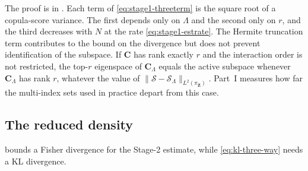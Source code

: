 \documentclass[review,hidelinks,onefignum,onetabnum]{siamart251216}
\newcommand{\mC}{\bm{C}}
\newcommand{\vZ}{\bm{Z}}
\newcommand{\scS}{\mathcal{S}}
\begin{document}
The proof is in . Each term of \eqref{eq:stage1-threeterm} is the square root of a copula-score variance. The first depends only on $\Lambda$ and the second only on $r$, and the third decreases with $N$ at the rate \eqref{eq:stage1-estrate}. The Hermite truncation term contributes to the bound on the divergence but does not prevent identification of the subspace. If $\mC$ has rank exactly $r$ and the interaction order is not restricted, the top-$r$ eigenspace of $\mC_\Lambda$ equals the active subspace whenever $\mC_\Lambda$ has rank $r$, whatever the value of $\|\scS-\scS_\Lambda\|_{L^2(\pi_{\vZ})}$. Part~I \cite{CAS_partI} measures how far the multi-index sets used in practice depart from this case.

\subsection{The reduced density}
\label{sec:stage2-error}

 bounds a Fisher divergence for the Stage-2 estimate, while \eqref{eq:kl-three-way} needs a KL divergence.
\end{document}
